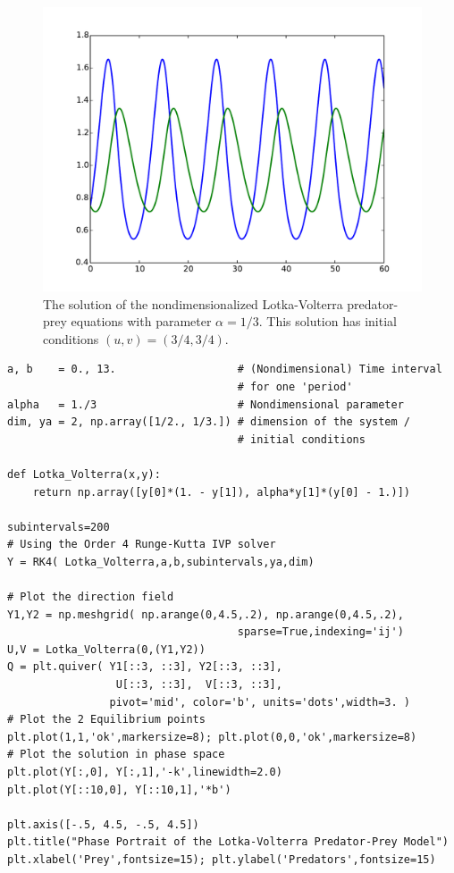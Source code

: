 \begin{figure}[ht]
\centering
\includegraphics[width=\textwidth]{Lotka_Volterra.pdf}
\caption{The solution of the nondimensionalized Lotka-Volterra 
predator-prey equations with parameter $\alpha = 1/3$. 
This solution has initial conditions $(u,v) = (3/4, 3/4)$. }
\label{pred-prey:Lotka_Voterra}
\end{figure}

\begin{lstlisting}
a, b 	= 0., 13. 					# (Nondimensional) Time interval 
									# for one 'period' 
alpha 	= 1./3              		# Nondimensional parameter
dim, ya = 2, np.array([1/2., 1/3.]) # dimension of the system / 
									# initial conditions

def Lotka_Volterra(x,y):
	return np.array([y[0]*(1. - y[1]), alpha*y[1]*(y[0] - 1.)])

subintervals=200
# Using the Order 4 Runge-Kutta IVP solver
Y = RK4( Lotka_Volterra,a,b,subintervals,ya,dim)

# Plot the direction field
Y1,Y2 = np.meshgrid( np.arange(0,4.5,.2), np.arange(0,4.5,.2),
									sparse=True,indexing='ij')
U,V = Lotka_Volterra(0,(Y1,Y2))
Q = plt.quiver( Y1[::3, ::3], Y2[::3, ::3], 
				 U[::3, ::3],  V[::3, ::3],
            	pivot='mid', color='b', units='dots',width=3. )
# Plot the 2 Equilibrium points
plt.plot(1,1,'ok',markersize=8); plt.plot(0,0,'ok',markersize=8) 
# Plot the solution in phase space
plt.plot(Y[:,0], Y[:,1],'-k',linewidth=2.0)
plt.plot(Y[::10,0], Y[::10,1],'*b')

plt.axis([-.5, 4.5, -.5, 4.5])
plt.title("Phase Portrait of the Lotka-Volterra Predator-Prey Model")
plt.xlabel('Prey',fontsize=15); plt.ylabel('Predators',fontsize=15)
\end{lstlisting}

